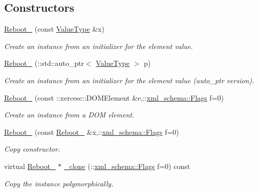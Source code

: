 \subsection*{Constructors}
\begin{DoxyCompactItemize}
\item 
\hyperlink{classopenstack_1_1xml_1_1Reboot___ab943191ad03562e0161776c7735c9b68}{Reboot\_\-} (const \hyperlink{classopenstack_1_1xml_1_1Reboot}{ValueType} \&x)
\begin{DoxyCompactList}\small\item\em Create an instance from an initializer for the element value. \item\end{DoxyCompactList}\item 
\hyperlink{classopenstack_1_1xml_1_1Reboot___af8ec59da8ad76fbaf4fd7fa11357de6f}{Reboot\_\-} (::std::auto\_\-ptr$<$ \hyperlink{classopenstack_1_1xml_1_1Reboot}{ValueType} $>$ p)
\begin{DoxyCompactList}\small\item\em Create an instance from an initializer for the element value (auto\_\-ptr version). \item\end{DoxyCompactList}\item 
\hyperlink{classopenstack_1_1xml_1_1Reboot___a14e797fe534c40f2119ceff30d6c5434}{Reboot\_\-} (const ::xercesc::DOMElement \&e,::\hyperlink{namespacexml__schema_affb4c227cbd9aa7453dd1dc5a1401943}{xml\_\-schema::Flags} f=0)
\begin{DoxyCompactList}\small\item\em Create an instance from a DOM element. \item\end{DoxyCompactList}\item 
\hyperlink{classopenstack_1_1xml_1_1Reboot___a16cd5d543224ed9c80946ef59bc02513}{Reboot\_\-} (const \hyperlink{classopenstack_1_1xml_1_1Reboot__}{Reboot\_\-} \&x,::\hyperlink{namespacexml__schema_affb4c227cbd9aa7453dd1dc5a1401943}{xml\_\-schema::Flags} f=0)
\begin{DoxyCompactList}\small\item\em Copy constructor. \item\end{DoxyCompactList}\item 
virtual \hyperlink{classopenstack_1_1xml_1_1Reboot__}{Reboot\_\-} $\ast$ \hyperlink{classopenstack_1_1xml_1_1Reboot___ac6565dfc854d3051645375d38ba3c9c9}{\_\-clone} (::\hyperlink{namespacexml__schema_affb4c227cbd9aa7453dd1dc5a1401943}{xml\_\-schema::Flags} f=0) const 
\begin{DoxyCompactList}\small\item\em Copy the instance polymorphically. \item\end{DoxyCompactList}\end{DoxyCompactItemize}
